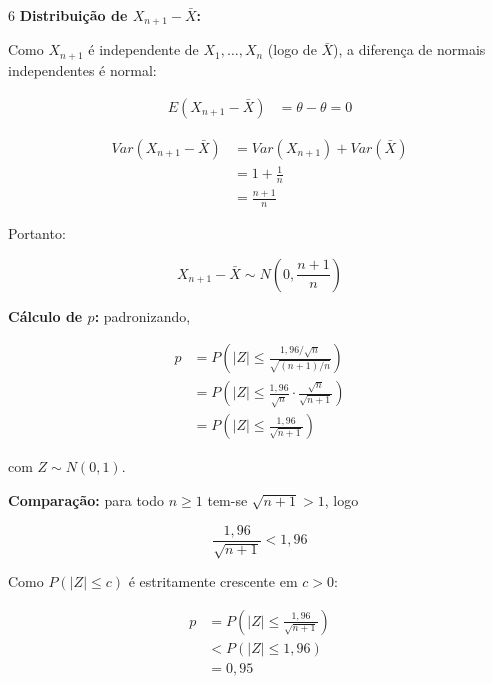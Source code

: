 \documentclass[8pt, a4paper, landscape]{extarticle}
\begin{document}
\begin{multicols}{6}
\textbf{Distribuição de $X_{n+1} - \bar{X}$:}

Como $X_{n+1}$ é independente de $X_1,\dots,X_n$ (logo de $\bar{X}$), a diferença de normais independentes é normal:

\begin{equation*}
\begin{split}
E(X_{n+1} - \bar{X}) &= \theta - \theta = 0
\end{split}
\end{equation*}

\begin{equation*}
\begin{split}
Var(X_{n+1} - \bar{X}) &= Var(X_{n+1}) + Var(\bar{X}) \\
&= 1 + \frac{1}{n} \\
&= \frac{n+1}{n}
\end{split}
\end{equation*}

Portanto:

\begin{equation*}
X_{n+1} - \bar{X} \sim N\left(0, \frac{n+1}{n}\right)
\end{equation*}

\textbf{Cálculo de $p$:} padronizando,

\begin{equation*}
\begin{split}
p &= P\left(|Z| \leq \frac{1,96/\sqrt{n}}{\sqrt{(n+1)/n}}\right) \\
&= P\left(|Z| \leq \frac{1,96}{\sqrt{n}} \cdot \frac{\sqrt{n}}{\sqrt{n+1}}\right) \\
&= P\left(|Z| \leq \frac{1,96}{\sqrt{n+1}}\right)
\end{split}
\end{equation*}

com $Z \sim N(0,1)$.

\textbf{Comparação:} para todo $n \geq 1$ tem-se $\sqrt{n+1} > 1$, logo

\begin{equation*}
\frac{1,96}{\sqrt{n+1}} < 1,96
\end{equation*}

Como $P(|Z| \leq c)$ é estritamente crescente em $c > 0$:

\begin{equation*}
\begin{split}
p &= P\left(|Z| \leq \frac{1,96}{\sqrt{n+1}}\right) \\
&< P(|Z| \leq 1,96) \\
&= 0,95
\end{split}
\end{equation*}


\end{multicols}
\end{document}

